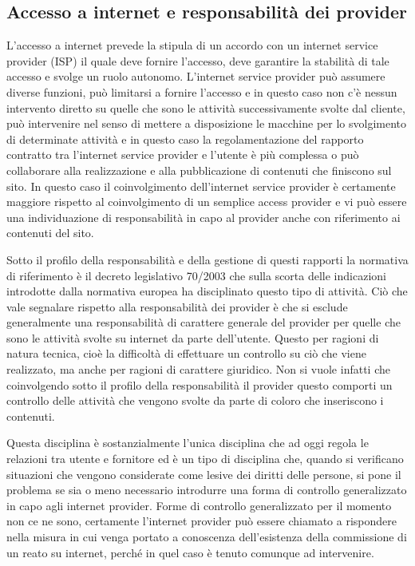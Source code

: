 \subsection{Accesso a internet e responsabilità dei provider}
L'accesso a internet prevede la stipula di un accordo con un internet service provider (ISP) il quale deve fornire l'accesso, deve garantire la stabilità di tale accesso e svolge un ruolo autonomo. L'internet service provider può assumere diverse funzioni, può limitarsi a fornire l'accesso e in questo caso non c'è nessun intervento diretto su quelle che sono le attività successivamente svolte dal cliente, può intervenire nel senso di mettere a disposizione le macchine per lo svolgimento di determinate attività e in questo caso la regolamentazione del rapporto contratto tra l'internet service provider e l'utente è più complessa o può collaborare alla realizzazione e alla pubblicazione di contenuti che finiscono sul sito. In questo caso il coinvolgimento dell'internet service provider è certamente maggiore rispetto al coinvolgimento di un semplice access provider e vi può essere una individuazione di responsabilità in capo al provider anche con riferimento ai contenuti del sito. 

Sotto il profilo della responsabilità e della gestione di questi rapporti la normativa di riferimento è il decreto legislativo 70/2003 che sulla scorta delle indicazioni introdotte dalla normativa europea ha disciplinato questo tipo di attività. Ciò che vale segnalare rispetto alla responsabilità dei provider è che si esclude generalmente una responsabilità di carattere generale del provider per quelle che sono le attività svolte su internet da parte dell'utente. Questo per ragioni di natura tecnica, cioè la difficoltà di effettuare un controllo su ciò che viene realizzato, ma anche per ragioni di carattere giuridico. Non si vuole infatti che coinvolgendo sotto il profilo della responsabilità il provider questo comporti un controllo delle attività che vengono svolte da parte di coloro che inseriscono i contenuti.

Questa disciplina è sostanzialmente l'unica disciplina che ad oggi regola le relazioni tra utente e fornitore ed è un tipo di disciplina che, quando si verificano situazioni che vengono considerate come lesive dei diritti delle persone, si pone il problema se sia o meno necessario introdurre una forma di controllo generalizzato in capo agli internet provider. 
Forme di controllo generalizzato per il momento non ce ne sono, certamente l'internet provider può essere chiamato a rispondere nella misura in cui venga portato a conoscenza dell'esistenza della commissione di un reato su internet, perché in quel caso è tenuto comunque ad intervenire. 

